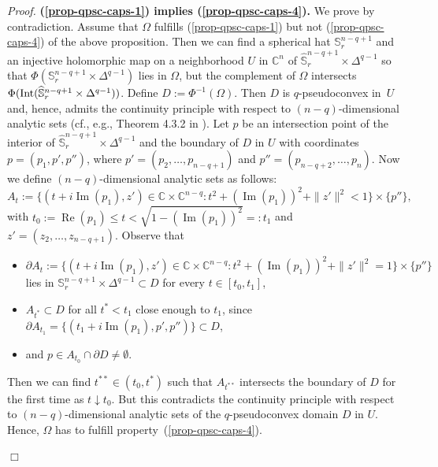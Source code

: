 \documentclass[11pt,a4paper]{article}
\newenvironment{proof}{\noindent\textit{Proof. }}{\hfill $\Box$\linebreak}
\newcommand{\CC}{\mathbb{C}}
\renewcommand{\SS}{\mathbb{S}}
\newcommand{\repa}[1]{\operatorname{Re}(#1)}
\newcommand{\impa}[1]{\operatorname{Im}(#1)}
\newcommand{\Int}{\hbox{Int}}
\begin{document}
\begin{proof} \textbf{(\ref{prop-qpsc-caps-1}) implies (\ref{prop-qpsc-caps-4}).} We prove by contradiction. Assume that $\Omega$ fulfills (\ref{prop-qpsc-caps-1}) but not (\ref{prop-qpsc-caps-4}) of the above proposition. Then we can find a spherical hat $\SS_r^{n-q+1}$ and an injective holomorphic map on a neighborhood $U$ in $\CC^n$ of $\widehat{\SS}_r^{n-q+1}\times\Delta^{q-1}$ so that $\Phi(\SS_r^{n-q+1}\times\Delta^{q-1})$ lies in $\Omega$, but the complement of $\Omega$ intersects $\Phi(\Int(\widehat{\SS}_r^{n-q+1}\times\Delta^{q-1}))$. Define $D:=\Phi^{-1}(\Omega)$. Then $D$ is $q$-pseudoconvex in~$U$ and, hence, admits the continuity principle with respect to $(n-q)$-dimensional analytic sets (cf., e.g., Theorem 4.3.2 in \cite{Paw}). Let $p$ be an intersection point of the interior of $\widehat{\SS}_r^{n-q+1}\times\Delta^{q-1}$ and the boundary of $D$ in $U$ with coordinates $p=(p_1,p',p'')$, where $p'=(p_2,\ldots,p_{n-q+1})$ and $p''=(p_{n-q+2},\ldots,p_n)$. Now we define $(n-q)$-dimensional analytic sets as follows:
\[
A_t:=\{(t+i\impa{p_1},z') \in \CC\times\CC^{n-q} : t^2+(\impa{p_1})^2 + \|z'\|^2 < 1 \} \times \{p''\},
\]
with $t_0:= \repa{p_1} \leq t < \sqrt{1-(\impa{p_1})^2 }=:t_1$ and $z'=(z_2,\ldots,z_{n-q+1})$. Observe that

\begin{itemize}

\item $\partial A_t:= \{(t+i\impa{p_1},z') \in \CC\times \CC^{n-q} : t^2+(\impa{p_1})^2 + \|z'\|^2 = 1 \} \times \{p''\}$ lies in $\SS_r^{n-q+1}\times\Delta^{q-1} \subset D$ for every $t \in [t_0,t_1]$,

\item $A_{t^*} \subset D$ for all $t^*<t_1$ close enough to $t_1$, since $\partial A_{t_1}=\{(t_1+i\impa{p_1},p',p'')\} \subset D$,

\item and $p \in A_{t_0} \cap \partial D \neq \emptyset$.

\end{itemize}

Then we can find $t^{**} \in (t_0,t^*)$ such that $A_{t^{**}}$ intersects the boundary of $D$ for the first time as $t \downarrow t_0$. But this contradicts the continuity principle with respect to $(n-q)$-dimensional analytic sets of the $q$-pseudoconvex domain $D$ in $U$. Hence, $\Omega$ has to fulfill property~(\ref{prop-qpsc-caps-4}).


\medskip


\end{proof}
\end{document}

